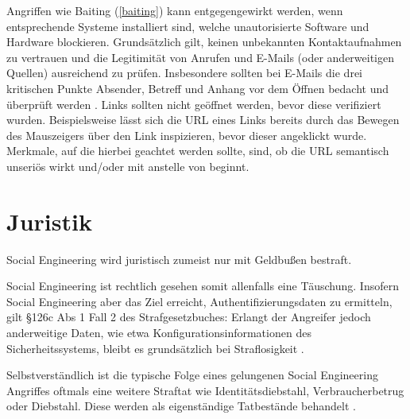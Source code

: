 Angriffen wie Baiting (\autoref{baiting}) kann entgegengewirkt werden, wenn entsprechende Systeme installiert sind, welche unautorisierte Software und Hardware blockieren.
Grundsätzlich gilt, keinen unbekannten Kontaktaufnahmen zu vertrauen  und die Legitimität von Anrufen und E-Mails (oder anderweitigen Quellen) ausreichend zu prüfen.
Insbesondere sollten bei E-Mails die drei kritischen Punkte Absender, Betreff und Anhang vor dem Öffnen bedacht und überprüft werden .
Links sollten nicht geöffnet werden, bevor diese verifiziert wurden. Beispielsweise lässt sich die URL eines Links bereits durch das Bewegen des Mauszeigers über den Link inspizieren, bevor dieser angeklickt wurde.
Merkmale, auf die hierbei geachtet werden sollte, sind, ob die URL semantisch unseriös wirkt und/oder mit  anstelle von  beginnt. 

\section{Juristik}

Social Engineering wird juristisch zumeist nur mit Geldbußen bestraft.

Social Engineering ist rechtlich gesehen somit allenfalls eine Täuschung.
Insofern Social Engineering aber das Ziel erreicht, Authentifizierungsdaten zu ermitteln, gilt §126c Abs 1 Fall 2 des Strafgesetzbuches:
Erlangt der Angreifer jedoch anderweitige Daten, wie etwa Konfigurationsinformationen des Sicherheitssystems, bleibt es grundsätzlich bei Straflosigkeit .

Selbstverständlich ist die typische Folge eines gelungenen Social Engineering Angriffes oftmals eine weitere Straftat wie Identitätsdiebstahl, Verbraucherbetrug oder Diebstahl.
Diese werden als eigenständige Tatbestände behandelt .
